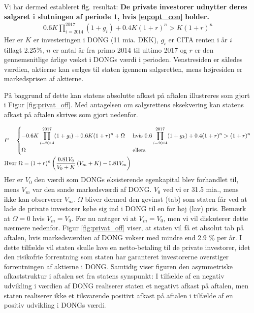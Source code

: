 \documentclass{article}
\begin{document}






Vi har dermed estableret flg. resultat: \textbf{De private investorer udnytter deres salgsret i slutningen af periode 1, hvis \eqref{eq:opt_con} holder. } 
\begin{align}
0.6K\prod_{i=2014}^{2017}(1+g_i)+0.4K(1+r)^n>K(1+r)^n \label{eq:opt_con}
\end{align}
Her er $K$ er investeringen i DONG (11 mia. DKK), $g_i$ er CITA renten i år $i$ tillagt 2.25\%, $n$ er antal år fra primo 2014 til ultimo 2017 og $r$ er den gennemsnitlige årlige vækst i DONGs værdi i perioden. Venstresiden er således værdien, aktierne kan sælges til staten igennem salgsretten, mens højresiden er markedsprisen af aktierne.

På baggrund af dette kan statens absolutte afkast på aftalen illustreres som gjort i Figur \ref{fig:privat_off}. Med antagelsen om salgsrettens eksekvering kan statens afkast på aftalen skrives som gjort nedenfor. %

\begin{align}
&P= 
\begin{dcases} 
-0.6K \prod_{i=2014}^{2017} (1+g_i)+0.6K(1+r)^n +\Omega&\text{     hvis    } 0.6\prod_{i=2014}^{2017}(1+g_k)+0.4(1+r)^n>(1+r)^n \\ 
\Omega  &\text{   ellers }
\end {dcases} \\
&\text{Hvor } \Omega=(1+r)^n\left( \frac{0.81V_0}{V_0+K} \left( V_m+K \right)-0.81V_m \right)
\label{eq:Goldman_deal}
\end{align}
Her er $V_0$ den værdi som DONGs eksisterende egenkapital blev forhandlet til, mens $V_m$ var den sande markedsværdi af DONG. $V_0$ ved vi er 31.5 mia., mens ikke kan observerer $V_m$. $\Omega$ bliver dermed den gevinst (tab) som staten får ved at lade de private investorer købe sig ind i DONG til en for høj (lav) pris. Bemærk at $\Omega=0$ hvis $V_m=V_0$. For nu antager vi at $V_m=V_0$, men vi vil diskuterer dette nærmere nedenfor. Figur \ref{fig:privat_off} viser, at staten vil få et absolut tab på aftalen, hvis markedsværdien af DONG vokser med mindre end 2.9 \% per år. I dette tilfælde vil staten skulle lave en netto-betaling til de private investorer, idet den risikofrie forrentning som staten har garanteret investorerne overstiger forrentningen af aktierne i DONG. Samtidig viser figuren den asymmetriske afkaststruktur i aftalen set fra statens synspunkt: I tilfælde af en negativ udvikling i værdien af DONG realiserer staten et negativt afkast på aftalen, men staten realiserer ikke et tilsvarende positivt afkast på aftalen i tilfælde af en positiv udvikling i DONGs værdi. 
\end{document}
